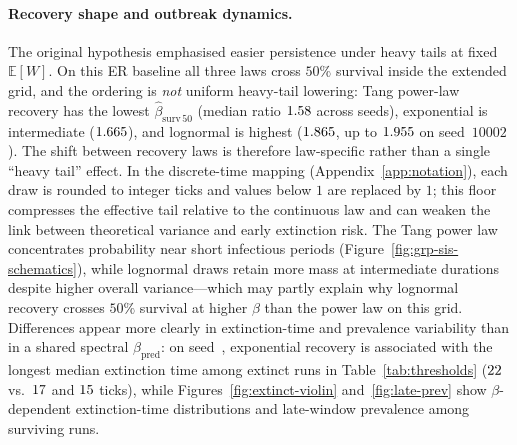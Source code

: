\documentclass[11pt,a4paper]{article}
\begin{document}
\paragraph{Recovery shape and outbreak dynamics.}
The original hypothesis emphasised easier persistence under heavy tails at fixed $\mathbb{E}[W]$. On this ER baseline all three laws cross $50\%$ survival inside the extended grid, and the ordering is \emph{not} uniform heavy-tail lowering: Tang power-law recovery has the lowest $\hat{\beta}_{\mathrm{surv}\,50}$ (median ratio $1.58$ across seeds), exponential is intermediate ($1.665$), and lognormal is highest ($1.865$, up to $1.955$ on seed~$10002$). The shift between recovery laws is therefore law-specific rather than a single ``heavy tail'' effect. In the discrete-time mapping (Appendix~\ref{app:notation}), each draw is rounded to integer ticks and values below $1$ are replaced by $1$; this floor compresses the effective tail relative to the continuous law and can weaken the link between theoretical variance and early extinction risk. The Tang power law concentrates probability near short infectious periods (Figure~\ref{fig:grp-sis-schematics}), while lognormal draws retain more mass at intermediate durations despite higher overall variance---which may partly explain why lognormal recovery crosses $50\%$ survival at higher $\beta$ than the power law on this grid. Differences appear more clearly in extinction-time and prevalence variability than in a shared spectral $\beta_{\mathrm{pred}}$: on seed~\RepPrimarySeed{}, exponential recovery is associated with the longest median extinction time among extinct runs in Table~\ref{tab:thresholds} ($22$ vs.\ $17$ and $15$ ticks), while Figures~\ref{fig:extinct-violin} and~\ref{fig:late-prev} show $\beta$-dependent extinction-time distributions and late-window prevalence among surviving runs.
\end{document}
